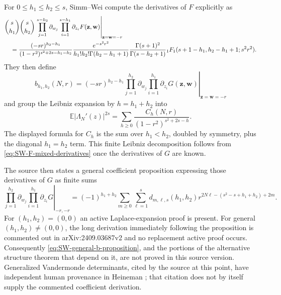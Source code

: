 For $0\leq h_1\leq h_2\leq s$, Simm--Wei compute the derivatives of $F$ explicitly as
\begin{align}
 &\binom{s}{h_1}\binom{s}{h_2}
 \left.\prod_{j=1}^{s-h_2}\partial_{w_j}
       \prod_{i=1}^{s-h_1}\partial_{z_i}F(\mathbf z,\mathbf w)
 \right|_{\mathbf z=\mathbf w=-r}\notag\\
 &\quad=\frac{(-sr)^{h_2-h_1}}
 {(1-r^2)^{s^2+2s-h_1-h_2}}
 \frac{e^{-s^2r^2}}{h_1!h_2!\Gamma(h_2-h_1+1)}
 \frac{\Gamma(s+1)^2}{\Gamma(s-h_2+1)}
 {}_1F_1(s+1-h_1,h_2-h_1+1;s^2r^2).
 \label{eq:SW-F-mixed-derivatives}
\end{align}
They then define
\begin{equation}
 b_{h_1,h_2}(N,r)=(-sr)^{h_2-h_1}
 \left.\prod_{j=1}^{h_2}\partial_{w_j}
       \prod_{i=1}^{h_1}\partial_{z_i}G(\mathbf z,\mathbf w)
 \right|_{\mathbf z=\mathbf w=-r}
 \label{eq:SW-bhh}
\end{equation}
and group the Leibniz expansion by $h=h_1+h_2$ into
\begin{equation}
 \mathbb E|\Lambda_N'(z)|^{2s}
 =\sum_{h\geq0}\frac{C_h(N,r)}{(1-r^2)^{s^2+2s-h}}.
 \label{eq:SW-structure-expansion}
\end{equation}
The displayed formula for $C_h$ is the sum over $h_1<h_2$, doubled by symmetry, plus the
diagonal $h_1=h_2$ term.  This finite Leibniz decomposition follows from
\eqref{eq:SW-F-mixed-derivatives} once the derivatives of $G$ are known.

The source then states a general coefficient proposition expressing those derivatives of
$G$ as finite sums
\begin{equation}
 \left.\prod_{j=1}^{h_2}\partial_{w_j}
       \prod_{i=1}^{h_1}\partial_{z_i}G\right|_{-r,-r}
 =(-1)^{h_1+h_2}\sum_{m\geq0}\sum_{\ell=1}^{s}
 d_{m,\ell,s}(h_1,h_2)
 r^{2N\ell-(s^2-s+h_1+h_2)+2m}.
 \label{eq:SW-general-b-proposition}
\end{equation}
For $(h_1,h_2)=(0,0)$ an active Laplace-expansion proof is present.  For general
$(h_1,h_2)\ne(0,0)$, the long derivation immediately following the proposition is commented
out in arXiv:2409.03687v2 and no replacement active proof occurs.  Consequently
\eqref{eq:SW-general-b-proposition}, and the portions of the alternative structure theorem
that depend on it, are not proved in this source version.
Generalized Vandermonde determinants, cited by the source at this point, have independent
human provenance in Heineman \cite{heineman1929}; that citation does not by itself supply the
commented coefficient derivation.

